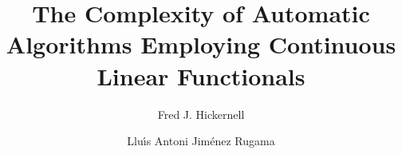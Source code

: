 \documentclass[final]{elsarticle}
\theoremstyle{definition}
\theoremstyle{remark}
\begin{document}
\begin{frontmatter}

\title{The Complexity of Automatic Algorithms Employing Continuous Linear Functionals}
\author{Fred J. Hickernell}
\address{Room E1-208, Department of Applied Mathematics, Illinois Institute of Technology,\\ 10 W.\ 32$^{\text{nd}}$ St., Chicago, IL 60616}
\author{Llu\'{\i}s Antoni Jim\'{e}nez Rugama}
\address{Room E1-120, Department of Applied Mathematics, Illinois Institute of Technology,\\ 10 W.\ 32$^{\text{nd}}$ St., Chicago, IL 60616}
\begin{abstract}
\end{abstract}

\begin{keyword}


\end{keyword}
\end{frontmatter}
\end{document}
